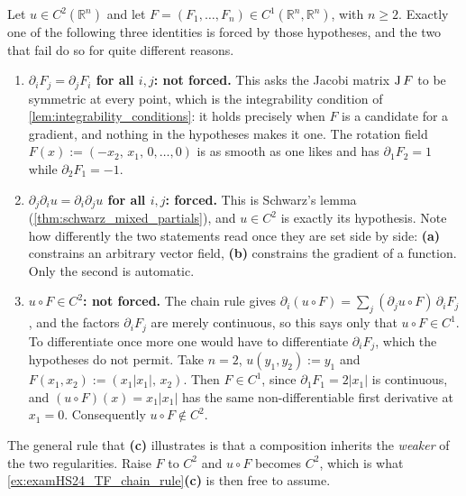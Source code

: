 \begin{example}
\label{ex:forced_identities_chain_rule}
Let $u \in C^2(\mathbb{R}^n)$ and let $F = (F_1,\dots,F_n) \in C^1(\mathbb{R}^n,\mathbb{R}^n)$,
with $n \geq 2$. Exactly one of the following three identities is forced by those hypotheses, and
the two that fail do so for quite different reasons.
\begin{enumerate}[label=\textbf{(\alph*)}]
  \item \textbf{$\partial_iF_j = \partial_jF_i$ for all $i,j$: not forced.} This asks the Jacobi
    matrix $\operatorname{J} F$ to be symmetric at every point, which is the integrability condition of
    \cref{lem:integrability_conditions}: it holds precisely when $F$ is a candidate for a gradient,
    and nothing in the hypotheses makes it one. The rotation field
    $F(x) := (-x_2,\, x_1,\, 0,\dots,0)$ is as smooth as one likes and has $\partial_1F_2 = 1$
    while $\partial_2F_1 = -1$.
  \item \textbf{$\partial_j\partial_iu = \partial_i\partial_ju$ for all $i,j$: forced.} This is
    Schwarz's lemma (\cref{thm:schwarz_mixed_partials}), and $u \in C^2$ is exactly its hypothesis.
    Note how differently the two statements read once they are set side by side: \textbf{(a)}
    constrains an arbitrary vector field, \textbf{(b)} constrains the gradient of a function. Only
    the second is automatic.
  \item \textbf{$u \circ F \in C^2$: not forced.} The chain rule gives
    $\partial_i(u\circ F) = \sum_{j}(\partial_ju\circ F)\,\partial_iF_j$, and the factors
    $\partial_iF_j$ are merely continuous, so this says only that $u \circ F \in C^1$. To
    differentiate once more one would have to differentiate $\partial_iF_j$, which the hypotheses
    do not permit. Take $n = 2$, $u(y_1,y_2) := y_1$ and $F(x_1,x_2) := (x_1\lvert x_1\rvert,\, x_2)$.
    Then $F \in C^1$, since $\partial_1F_1 = 2\lvert x_1\rvert$ is continuous, and
    $(u\circ F)(x) = x_1\lvert x_1\rvert$ has the same non-differentiable first derivative at
    $x_1 = 0$. Consequently $u \circ F \notin C^2$.
\end{enumerate}
The general rule that \textbf{(c)} illustrates is that a composition inherits the \emph{weaker} of
the two regularities. Raise $F$ to $C^2$ and $u \circ F$ becomes $C^2$, which is what
\cref{ex:examHS24_TF_chain_rule}\textbf{(c)} is then free to assume.
\end{example}
